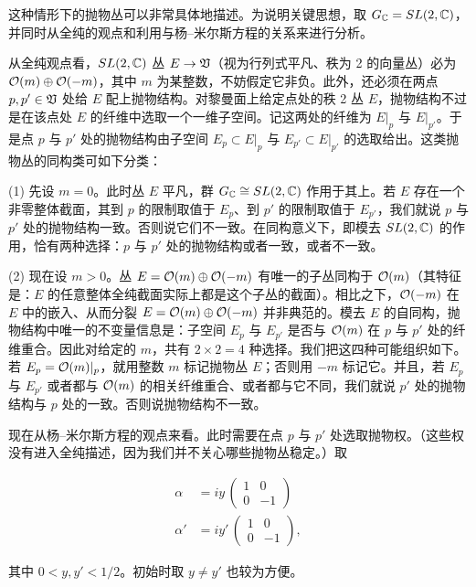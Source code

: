 这种情形下的抛物丛可以非常具体地描述。为说明关键思想，取 $G_{\mathbb{C}}=SL(2,{\mathbb{C}})$，并同时从全纯的观点和利用与杨–米尔斯方程的关系来进行分析。

从全纯观点看，$SL(2,{\mathbb{C}})$ 丛 $E\to \mathfrak{V}$（视为行列式平凡、秩为 2 的向量丛）必为 ${\mathcal O}(m)\oplus {\mathcal O}(-m)$，其中 $m$ 为某整数，不妨假定它非负。此外，还必须在两点 $p,p'\in
\mathfrak{V}$ 处给 $E$ 配上抛物结构。对黎曼面上给定点处的秩 2 丛 $E$，抛物结构不过是在该点处 $E$ 的纤维中选取一个一维子空间。记这两处的纤维为 $E|_p$ 与 $E|_{p'}$。于是点 $p$ 与 $p'$ 处的抛物结构由子空间 $E_p\subset E|_p$ 与 $E_{p'}\subset E|_{p'}$ 的选取给出。这类抛物丛的同构类可如下分类：

(1) 先设 $m=0$。此时丛 $E$ 平凡，群 $G_{\mathbb{C}}\cong
SL(2,{\mathbb{C}})$ 作用于其上。若 $E$ 存在一个非零整体截面，其到 $p$ 的限制取值于 $E_p$、到 $p'$ 的限制取值于 $E_{p'}$，我们就说 $p$ 与 $p'$ 处的抛物结构一致。否则说它们不一致。在同构意义下，即模去 $SL(2,{\mathbb{C}})$ 的作用，恰有两种选择：$p$ 与 $p'$ 处的抛物结构或者一致，或者不一致。

(2) 现在设 $m>0$。丛 $E={\mathcal O}(m)\oplus {\mathcal O}(-m)$ 有唯一的子丛同构于 ${\mathcal O}(m)$（其特征是：$E$ 的任意整体全纯截面实际上都是这个子丛的截面）。相比之下，${\mathcal O}(-m)$ 在 $E$ 中的嵌入、从而分裂 $E={\mathcal O}(m)\oplus {\mathcal O}(-m)$ 并非典范的。模去 $E$ 的自同构，抛物结构中唯一的不变量信息是：子空间 $E_p$ 与 $E_{p'}$ 是否与 ${\mathcal O}(m)$ 在 $p$ 与 $p'$ 处的纤维重合。因此对给定的 $m$，共有 $2\times 2=4$ 种选择。我们把这四种可能组织如下。若 $E_p={\mathcal O}(m)|_p$，就用整数 $m$ 标记抛物丛 $E$；否则用 $-m$ 标记它。并且，若 $E_p$ 与 $E_{p'}$ 或者都与 ${\mathcal O}(m)$ 的相关纤维重合、或者都与它不同，我们就说 $p'$ 处的抛物结构与 $p$ 处的一致。否则说抛物结构不一致。

现在从杨–米尔斯方程的观点来看。此时需要在点 $p$ 与 $p'$ 处选取抛物权。（这些权没有进入全纯描述，因为我们并不关心哪些抛物丛稳定。）取

\setcounter{equation}{9}
\begin{equation}\label{eq:5.10}
  \begin{aligned}\alpha&=iy\,\left(\begin{matrix}1 & 0\\ 0&-1\end{matrix}\right)\\
\alpha'&=iy'\,\left(\begin{matrix}1 & 0\\ 0&-1\end{matrix}\right),\end{aligned}
\end{equation}

其中 $0<y,y'<1/2$。初始时取 $y\not=y'$ 也较为方便。


